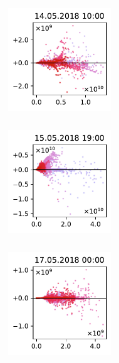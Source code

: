 \begin{figure}[H]
    \centering
    \begin{subfigure}
        \centering
        \includegraphics[width=0.30\textwidth,valign=t]{evaluation/figures/perturbations/perturbation-14.05.2018:10.00-so2-mul-1.01.pdf}
    \end{subfigure}
    \begin{subfigure}
        \centering
        \includegraphics[width=0.30\textwidth,valign=t]{evaluation/figures/perturbations/perturbation-15.05.2018:19.00-so2-mul-1.01.pdf}
    \end{subfigure}
    \begin{subfigure}
        \centering
        \includegraphics[width=0.30\textwidth,valign=t]{evaluation/figures/perturbations/perturbation-17.05.2018:00.00-so2-mul-1.01.pdf}
    \end{subfigure}


\end{figure}
